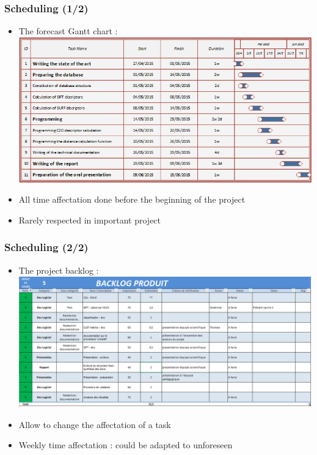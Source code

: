 \documentclass[xcolor=table]{beamer}
\begin{document}
\begin{frame} \frametitle{Scheduling (1/2)}

\begin{itemize}
\item The forecast Gantt chart  :
\includegraphics[scale=0.40]{GanttPrez.png}
\item All time affectation done before the beginning of the project
\item Rarely respected in important project
\end{itemize}

\end{frame}


\begin{frame} \frametitle{Scheduling (2/2)}


\begin{itemize}
\item The project backlog  :
\includegraphics[scale=0.30]{backlog.png}
\item Allow to change the affectation of a task
\item Weekly time affectation : could be adapted to unforeseen
\end{itemize}


\end{frame}
\end{document}
